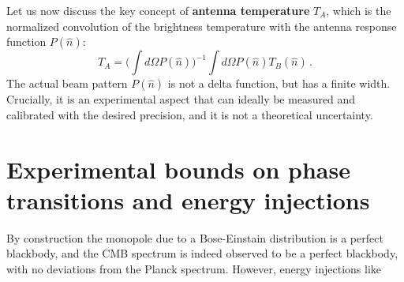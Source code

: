 Let us now discuss the key concept of \textbf{antenna temperature} $T_A$, which is the normalized convolution of the brightness temperature with the antenna response function $P(\hat{n})$:   
\begin{equation}
    T_A = \Big(\int d\Omega P(\hat{n}) \Big)^{-1} \int d\Omega P(\hat{n}) T_B(\hat{n}) \,.
\end{equation}
The actual beam pattern $P(\hat{n})$ is not a delta function, but has a finite width.
Crucially, it is an experimental aspect that can ideally be measured and calibrated with the desired precision, and it is not a theoretical uncertainty.


\section{Experimental bounds on phase transitions and energy injections}

By construction the monopole due to a Bose-Einstain distribution is a perfect blackbody, and the CMB spectrum is indeed observed to be a perfect blackbody, with no deviations from the Planck spectrum.
However, energy injections like 